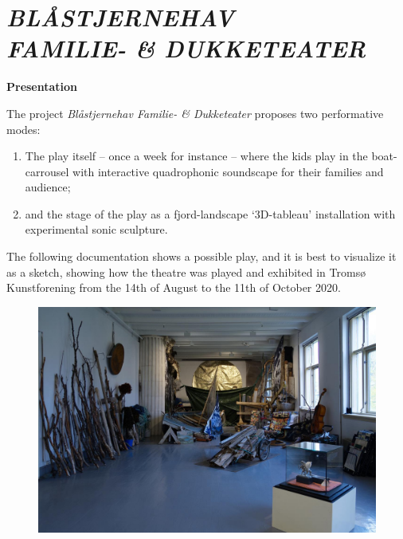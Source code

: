 \chapter*{ \textsl{\textbf{BL\AA STJERNEHAV  \\ FAMILIE- \& DUKKETEATER}}}

\label{psh}

\vspace{1cm}

{\Large \textbf{Presentation}}

\bigskip
\bigskip

The project \textsl{Bl\aa stjernehav Familie- \& Dukketeater} proposes two performative modes: 
\begin{enumerate}
\item The play itself -- once a week for instance -- where the kids play in the boat-carrousel with interactive quadrophonic soundscape for their families and audience;
\item and the stage of the play as a fjord-landscape `3D-tableau' installation with experimental sonic sculpture.
\end{enumerate}

\bigskip

The following documentation shows a possible play, and it is best to visualize it as a sketch, showing how the theatre was played and exhibited in Troms\o{} Kunstforening from the 14th of August to the 11th of October 2020. 

\bigskip

\begin{figure}[h]
		\includegraphics[width=\textwidth]{mp/img/img1}
		\label{sh}
\end{figure}

